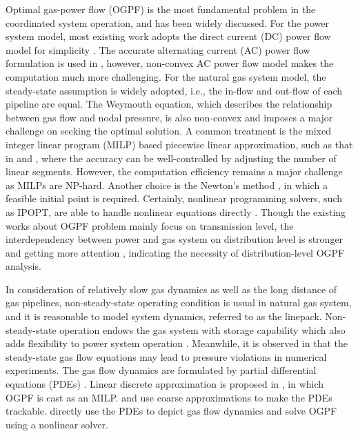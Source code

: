 \documentclass[journal]{IEEEtran}
\begin{document}
Optimal gas-power flow (OGPF) is the most fundamental problem in the coordinated system operation, and has been widely discussed. For the power system model, most existing work adopts the direct current (DC) power flow model for simplicity \cite{Chaudry_DCOPF,Cong_Dispatch,Cong_PDE,Anatoly_PDE,Chengcheng_MILP}. The accurate alternating current (AC) power flow formulation is used in \cite{Alberto_Newton,Sheng_Probabilistic}, however, non-convex AC power flow model makes the computation much more challenging. For the natural gas system model, the steady-state assumption is widely adopted, i.e., the in-flow and out-flow of each pipeline are equal\cite{Chengcheng_MILP,Alberto_Newton, Wolf_BNG,Carlos_MILP}. The Weymouth equation, which describes the relationship between gas flow and nodal pressure, is also non-convex and imposes a major challenge on seeking the optimal solution. A common treatment is the mixed integer linear program (MILP) based piecewise linear approximation, such as that in \cite{Chengcheng_MILP} and \cite{Carlos_MILP}, where the accuracy can be well-controlled by adjusting the number of linear segments. However, the computation efficiency remains a major challenge as MILPs are NP-hard. Another choice is the Newton's method \cite{Alberto_Newton}, in which a feasible initial point is required. Certainly, nonlinear programming solvers, such as IPOPT, are able to handle nonlinear equations directly \cite{Anatoly_PDE}. Though the existing works about OGPF problem mainly focus on transmission level, the interdependency between power and gas system on distribution level is stronger \cite{GE_GasPower} and getting more attention \cite{Urban_GasPower,Distribution_GasPower}, indicating the necessity of distribution-level OGPF analysis.

In consideration of relatively slow gas dynamics as well as the long distance of gas pipelines, non-steady-state operating condition is usual in natural gas system, and it is reasonable to model system dynamics, referred to as the linepack. Non-steady-state operation endows the gas system   with storage capability which also adds flexibility to power system operation  \cite{Nico_SingleDirection}. Meanwhile, it is observed in \cite{Anatoly_PDE} that the steady-state gas flow equations may lead to pressure violations in numerical experiments. The gas flow dynamics are formulated by partial differential equations (PDEs) \cite{Dorin_PDEs}. Linear discrete approximation is proposed in \cite{CorreaPosada2015}, in which OGPF is cast as an MILP. \cite{Chaudry_DCOPF} and \cite{Cong_PDE} use coarse approximations to make the PDEs trackable. \cite{Anatoly_PDE} directly use the PDEs to depict gas flow dynamics and solve OGPF using a nonlinear solver.
\end{document}
